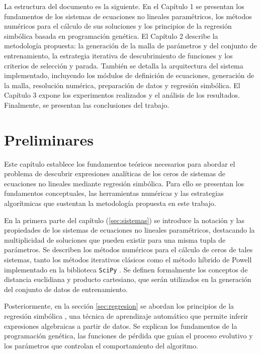 \documentclass[12pt,a4paper]{article} \usepackage[utf8]{inputenc} \usepackage[spanish]{babel} \usepackage{amsmath, amssymb, amsthm} \usepackage{bm} \usepackage{float} \usepackage{longtable} \usepackage[hidelinks]{hyperref}
\begin{document}
La estructura del documento es la siguiente.  En el Capítulo 1 se
presentan los fundamentos de los sistemas de ecuaciones no lineales
paramétricos, los métodos numéricos para el cálculo de sus soluciones y
los principios de la regresión simbólica basada en programación
genética.  El Capítulo 2 describe la metodología propuesta: la
generación de la malla de parámetros y del conjunto de entrenamiento,
la estrategia iterativa de descubrimiento de funciones y los criterios
de selección y parada.  También se detalla la arquitectura del sistema
implementado, incluyendo los módulos de definición de ecuaciones,
generación de la malla, resolución numérica, preparación de datos y
regresión simbólica.  El Capítulo 3 expone los experimentos realizados
y el análisis de los resultados.  Finalmente, se presentan las
conclusiones del trabajo.

\newpage

\section{Preliminares}
\label{sec:preliminares}

Este capítulo establece los fundamentos teóricos necesarios para abordar el problema de descubrir expresiones analíticas de los ceros de sistemas de ecuaciones no lineales mediante regresión simbólica. Para ello se presentan los fundamentos conceptuales, las herramientas numéricas y las estrategias algorítmicas que sustentan la metodología propuesta en este trabajo.

En la primera parte del capítulo (\ref{sec:sistemas}) se introduce la notación y las propiedades de los sistemas de ecuaciones no lineales paramétricos, destacando la multiplicidad de soluciones que pueden existir para una misma tupla de parámetros. Se describen los métodos numéricos para el cálculo de ceros de tales sistemas, tanto los métodos iterativos clásicos como el método híbrido de Powell implementado en la biblioteca \texttt{SciPy} \cite{virtanen2020scipy}. Se definen formalmente los conceptos de distancia euclidiana y producto cartesiano, que serán utilizados en la generación del conjunto de datos de entrenamiento.

Posteriormente, en la sección \ref{sec:regresion} se abordan los principios de la regresión simbólica \cite{koza1992genetic}, una técnica de aprendizaje automático que permite inferir expresiones algebraicas a partir de datos. Se explican los fundamentos de la programación genética, las funciones de pérdida que guían el proceso evolutivo y los parámetros que controlan el comportamiento del algoritmo.
\end{document}
